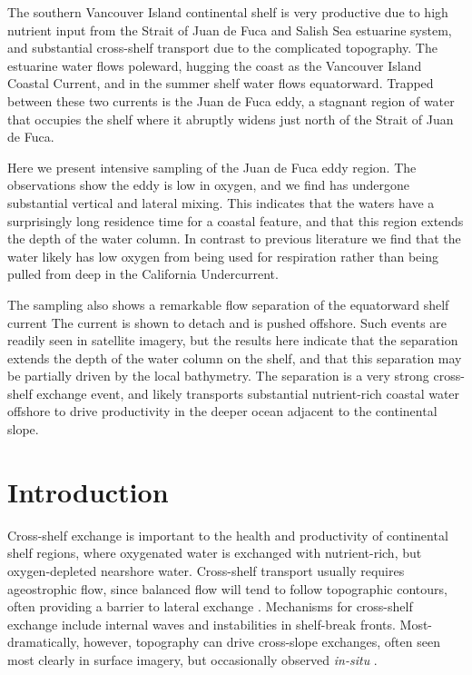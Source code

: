\documentclass[draft]{agujournal2019}
\begin{document}
The southern Vancouver Island continental shelf is very productive due to high nutrient input from the Strait of Juan de Fuca and Salish Sea estuarine system, and substantial cross-shelf transport due to the complicated topography.  The estuarine water flows poleward, hugging the coast as the Vancouver Island Coastal Current, and in the summer shelf water flows equatorward.  Trapped between these two currents is the Juan de Fuca eddy, a stagnant region of water that occupies the shelf where it abruptly widens just north of the Strait of Juan de Fuca.

Here we present intensive sampling of the Juan de Fuca eddy region. The observations show the eddy is low in oxygen, and we find has undergone substantial vertical and lateral mixing. This indicates that the waters have a surprisingly long residence time for a coastal feature, and that this region extends the depth of the water column.  In contrast to previous literature we find that the water likely has low oxygen from being used for respiration rather than being pulled from deep in the California Undercurrent.

The sampling also shows a remarkable flow separation of the equatorward shelf current  The current is shown to detach and is pushed offshore. Such events are readily seen in satellite imagery, but the results here indicate that the separation extends the depth of the water column on the shelf, and that this separation may be partially driven by the local bathymetry.  The separation is a very strong cross-shelf exchange event, and likely transports substantial nutrient-rich coastal water offshore to drive productivity in the deeper ocean adjacent to the continental slope.

%
%


\section{Introduction}

Cross-shelf exchange is important to the health and productivity of continental shelf regions, where oxygenated water is exchanged with nutrient-rich, but oxygen-depleted nearshore water.  Cross-shelf transport usually requires ageostrophic flow, since balanced flow will tend to follow topographic contours, often providing a barrier to lateral exchange \cite{brink16}.  Mechanisms for cross-shelf exchange include internal waves and instabilities in shelf-break fronts.  Most-dramatically, however, topography can drive cross-slope exchanges, often seen most clearly in surface imagery, but occasionally observed \emph{in-situ} \cite{barthetal00}.
\end{document}
